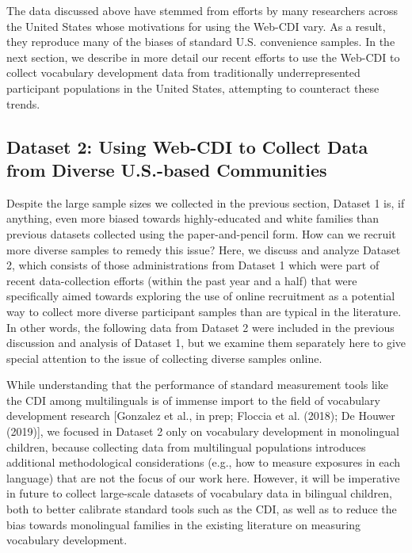 \documentclass[
  english,
  ,man,floatsintext]{apa6}
\begin{document}
The data discussed above have stemmed from efforts by many researchers across the United States whose motivations for using the Web-CDI vary. As a result, they reproduce many of the biases of standard U.S. convenience samples. In the next section, we describe in more detail our recent efforts to use the Web-CDI to collect vocabulary development data from traditionally underrepresented participant populations in the United States, attempting to counteract these trends.

\hypertarget{dataset-2-using-web-cdi-to-collect-data-from-diverse-u.s.-based-communities}{%
\subsection{Dataset 2: Using Web-CDI to Collect Data from Diverse U.S.-based Communities}\label{dataset-2-using-web-cdi-to-collect-data-from-diverse-u.s.-based-communities}}

Despite the large sample sizes we collected in the previous section, Dataset 1 is, if anything, even more biased towards highly-educated and white families than previous datasets collected using the paper-and-pencil form. How can we recruit more diverse samples to remedy this issue? Here, we discuss and analyze Dataset 2, which consists of those administrations from Dataset 1 which were part of recent data-collection efforts (within the past year and a half) that were specifically aimed towards exploring the use of online recruitment as a potential way to collect more diverse participant samples than are typical in the literature. In other words, the following data from Dataset 2 were included in the previous discussion and analysis of Dataset 1, but we examine them separately here to give special attention to the issue of collecting diverse samples online.

While understanding that the performance of standard measurement tools like the CDI among multilinguals is of immense import to the field of vocabulary development research {[}Gonzalez et al., in prep; Floccia et al. (2018); De Houwer (2019){]}, we focused in Dataset 2 only on vocabulary development in monolingual children, because collecting data from multilingual populations introduces additional methodological considerations (e.g., how to measure exposures in each language) that are not the focus of our work here. However, it will be imperative in future to collect large-scale datasets of vocabulary data in bilingual children, both to better calibrate standard tools such as the CDI, as well as to reduce the bias towards monolingual families in the existing literature on measuring vocabulary development.
\end{document}
